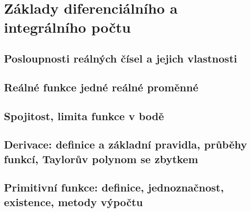 \documentclass[../../main.tex]{subfiles}
\begin{document}
\section{Základy diferenciálního a integrálního počtu}

\subsection{Posloupnosti reálných čísel a jejich vlastnosti}
\subsection{Reálné funkce jedné reálné proměnné}
\subsection{Spojitost, limita funkce v bodě}
\subsection{Derivace: definice a základní pravidla, průběhy funkcí, Taylorův polynom se zbytkem}
\subsection{Primitivní funkce: definice, jednoznačnost, existence, metody výpočtu}
\end{document}
